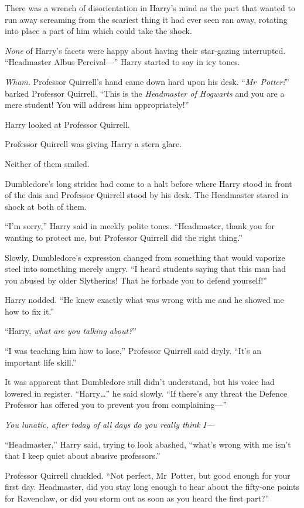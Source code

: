There was a wrench of disorientation in Harry’s mind as the part that wanted to run away screaming from the scariest thing it had ever seen ran away, rotating into place a part of him which could take the shock.

\emph{None} of Harry’s facets were happy about having their star-gazing interrupted. “Headmaster Albus Percival—” Harry started to say in icy tones.

\emph{Wham.} Professor Quirrell’s hand came down hard upon his desk. “\emph{Mr~Potter!}” barked Professor Quirrell. “This is the \emph{Headmaster of Hogwarts} and you are a mere student! You will address him appropriately!”

Harry looked at Professor Quirrell.

Professor Quirrell was giving Harry a stern glare.

Neither of them smiled.

Dumbledore’s long strides had come to a halt before where Harry stood in front of the dais and Professor Quirrell stood by his desk. The Headmaster stared in shock at both of them.

“I’m sorry,” Harry said in meekly polite tones. “Headmaster, thank you for wanting to protect me, but Professor Quirrell did the right thing.”

Slowly, Dumbledore’s expression changed from something that would vaporize steel into something merely angry. “I heard students saying that this man had you abused by older Slytherins! That he forbade you to defend yourself!”

Harry nodded. “He knew exactly what was wrong with me and he showed me how to fix it.”

“Harry, \emph{what are you talking about?}”

“I was teaching him how to lose,” Professor Quirrell said dryly. “It’s an important life skill.”

It was apparent that Dumbledore still didn’t understand, but his voice had lowered in register. “Harry…” he said slowly. “If there’s any threat the Defence Professor has offered you to prevent you from complaining—”

\emph{You lunatic, after today of all days do you really think I—}

“Headmaster,” Harry said, trying to look abashed, “what’s wrong with me isn’t that I keep quiet about abusive professors.”

Professor Quirrell chuckled. “Not perfect, Mr~Potter, but good enough for your first day. Headmaster, did you stay long enough to hear about the fifty-one points for Ravenclaw, or did you storm out as soon as you heard the first part?”

